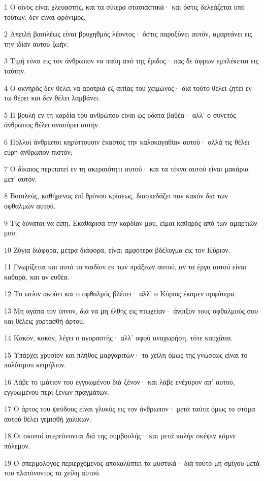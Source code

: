 \par 1 Ο οίνος είναι χλευαστής, και τα σίκερα στασιαστικά· και όστις δελεάζεται υπό τούτων, δεν είναι φρόνιμος.
\par 2 Απειλή βασιλέως είναι βρυχηθμός λέοντος· όστις παροξύνει αυτόν, αμαρτάνει εις την ιδίαν αυτού ζωήν.
\par 3 Τιμή είναι εις τον άνθρωπον να παύη από της έριδος· πας δε άφρων εμπλέκεται εις ταύτην.
\par 4 Ο οκνηρός δεν θέλει να αροτριά εξ αιτίας του χειμώνος· διά τούτο θέλει ζητεί εν τω θέρει και δεν θέλει λαμβάνει.
\par 5 Η βουλή εν τη καρδία του ανθρώπου είναι ως ύδατα βαθέα· αλλ' ο συνετός άνθρωπος θέλει ανασύρει αυτήν.
\par 6 Πολλοί άνθρωποι κηρύττουσιν έκαστος την καλοκαγαθίαν αυτού· αλλά τις θέλει εύρη άνθρωπον πιστόν;
\par 7 Ο δίκαιος περιπατεί εν τη ακεραιότητι αυτού· και τα τέκνα αυτού είναι μακάρια μετ' αυτόν.
\par 8 Βασιλεύς, καθήμενος επί θρόνου κρίσεως, διασκεδάζει παν κακόν διά των οφθαλμών αυτού.
\par 9 Τις δύναται να είπη, Εκαθάρισα την καρδίαν μου, είμαι καθαρός από των αμαρτιών μου;
\par 10 Ζύγια διάφορα, μέτρα διάφορα, είναι αμφότερα βδέλυγμα εις τον Κύριον.
\par 11 Γνωρίζεται και αυτό το παιδίον εκ των πράξεων αυτού, αν τα έργα αυτού είναι καθαρά, και αν ευθέα.
\par 12 Το ωτίον ακούει και ο οφθαλμός βλέπει· αλλ' ο Κύριος έκαμεν αμφότερα.
\par 13 Μη αγάπα τον ύπνον, διά να μη έλθης εις πτωχείαν· άνοιξον τους οφθαλμούς σου και θέλεις χορτασθή άρτου.
\par 14 Κακόν, κακόν, λέγει ο αγοραστής· αλλ' αφού αναχωρήση, τότε καυχάται.
\par 15 Υπάρχει χρυσίον και πλήθος μαργαριτών· τα χείλη όμως της γνώσεως είναι το πολύτιμου κειμήλιον.
\par 16 Λάβε το ιμάτιον του εγγυωμένου διά ξένον· και λάβε ενέχυρον απ' αυτού, εγγυωμένου περί ξένων πραγμάτων.
\par 17 Ο άρτος του ψεύδους είναι γλυκύς εις τον άνθρωπον· μετά ταύτα όμως το στόμα αυτού θέλει γεμισθή χαλίκων.
\par 18 Οι σκοποί στερεόνονται διά της συμβουλής· και μετά καλήν σκέψιν κάμνε πόλεμον.
\par 19 Ο σπερμολόγος περιερχόμενος αποκαλύπτει τα μυστικά· διά τούτο μη σμίγου μετά του πλατύνοντος τα χείλη αυτού.
